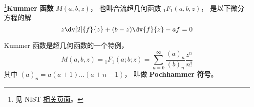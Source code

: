 
\begin{issues}
\issueDraft
\end{issues}

\footnote{见 NIST \href{https://dlmf.nist.gov/13.2}{相关页面}。}\textbf{Kummer 函数} $M(a, b, z)$， 也叫合流超几何函数 $_1F_1(a, b, z)$， 是以下微分方程的解
\begin{equation}
z\dv[2]{f}{z} + (b-z)\dv{f}{z} - a f = 0
\end{equation}

Kummer 函数是超几何函数的一个特例， 
\begin{equation}
M(a, b, z) = {_1F_1}(a; b; z) = \sum_{n=0}^\infty \frac{(a)_n}{(b)_n} \frac{z^n}{n!}
\end{equation}
其中 $(a)_n = a(a+1)\dots(a+n-1)$， 叫做 \textbf{Pochhammer 符号}。


